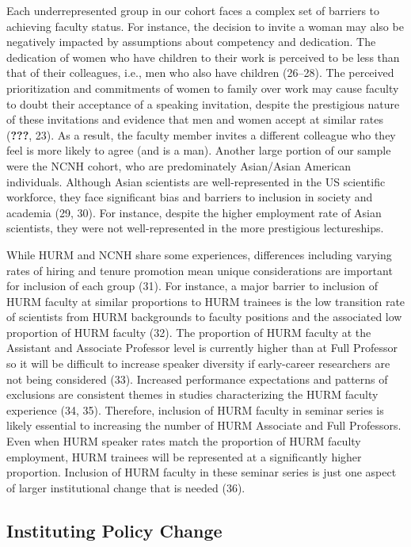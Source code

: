 \documentclass[10pt,]{article}
\begin{document}
Each underrepresented group in our cohort faces a complex set of
barriers to achieving faculty status. For instance, the decision to
invite a woman may also be negatively impacted by assumptions about
competency and dedication. The dedication of women who have children to
their work is perceived to be less than that of their colleagues, i.e.,
men who also have children (26--28). The perceived prioritization and
commitments of women to family over work may cause faculty to doubt
their acceptance of a speaking invitation, despite the prestigious
nature of these invitations and evidence that men and women accept at
similar rates ({\textbf{???}}, 23). As a result, the faculty member
invites a different colleague who they feel is more likely to agree (and
is a man). Another large portion of our sample were the NCNH cohort, who
are predominately Asian/Asian American individuals. Although Asian
scientists are well-represented in the US scientific workforce, they
face significant bias and barriers to inclusion in society and academia
(29, 30). For instance, despite the higher employment rate of Asian
scientists, they were not well-represented in the more prestigious
lectureships.

While HURM and NCNH share some experiences, differences including
varying rates of hiring and tenure promotion mean unique considerations
are important for inclusion of each group (31). For instance, a major
barrier to inclusion of HURM faculty at similar proportions to HURM
trainees is the low transition rate of scientists from HURM backgrounds
to faculty positions and the associated low proportion of HURM faculty
(32). The proportion of HURM faculty at the Assistant and Associate
Professor level is currently higher than at Full Professor so it will be
difficult to increase speaker diversity if early-career researchers are
not being considered (33). Increased performance expectations and
patterns of exclusions are consistent themes in studies characterizing
the HURM faculty experience (34, 35). Therefore, inclusion of HURM
faculty in seminar series is likely essential to increasing the number
of HURM Associate and Full Professors. Even when HURM speaker rates
match the proportion of HURM faculty employment, HURM trainees will be
represented at a significantly higher proportion. Inclusion of HURM
faculty in these seminar series is just one aspect of larger
institutional change that is needed (36).

\subsection{Instituting Policy Change}\label{instituting-policy-change}
\end{document}
